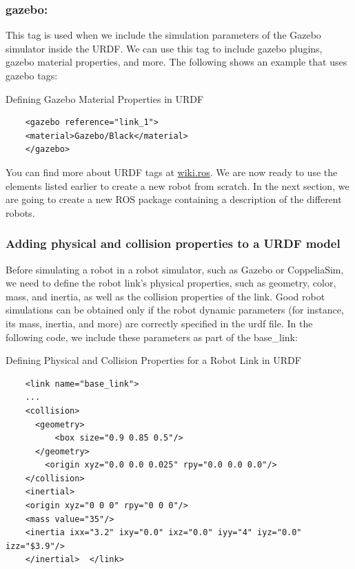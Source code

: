 \documentclass[../../main]{subfiles}
\begin{document}
\subsubsection{gazebo:}
This tag is used when we include the simulation parameters of the
Gazebo simulator inside the URDF. We can use this tag to include gazebo plugins,
gazebo material properties, and more. The following shows an example that uses
gazebo tags:

\begin{codebox}[]{Defining Gazebo Material Properties in URDF }
  \begin{verbatim}
    <gazebo reference="link_1">
    <material>Gazebo/Black</material>
    </gazebo>
\end{verbatim}
  \end{codebox}
You can find more about URDF tags at \href{http://wiki.ros.org/urdf/XML}{wiki.ros}\cite{ros_urdf_xml}. We are now
ready to use the elements listed earlier to create a new robot from scratch. In the next
section, we are going to create a new ROS package containing a description of the different
robots.

\subsubsection{Adding physical and collision properties to a URDF model}
Before simulating a robot in a robot simulator, such as Gazebo or CoppeliaSim, we need
to define the robot link's physical properties, such as geometry, color, mass, and inertia, as
well as the collision properties of the link.
Good robot simulations can be obtained only if the robot dynamic parameters (for
instance, its mass, inertia, and more) are correctly specified in the urdf file. In the
following code, we include these parameters as part of the base\_link:
\begin{codebox}[]{Defining Physical and Collision Properties for a Robot Link in URDF}
  
  \begin{verbatim}
    <link name="base_link">
    ...
    <collision>
      <geometry>
          <box size="0.9 0.85 0.5"/>
      </geometry>
        <origin xyz="0.0 0.0 0.025" rpy="0.0 0.0 0.0"/>
    </collision>
    <inertial>
    <origin xyz="0 0 0" rpy="0 0 0"/>
    <mass value="35"/>
    <inertia ixx="3.2" ixy="0.0" ixz="0.0" iyy="4" iyz="0.0" izz="$3.9"/>
    </inertial>  </link>
\end{verbatim}
  \end{codebox}
\end{document}
